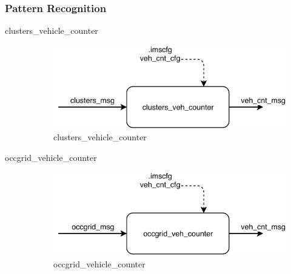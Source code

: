 \subsubsection{Pattern Recognition}
\begin{description}

\item[clusters\_vehicle\_counter] \hfill

\begin{figure}[ht!]
\centering
\includegraphics[scale=1]{fig/3/clusters_veh_counter.pdf}
\caption{clusters\_vehicle\_counter}
\label{clusters_vehicle_counter}
\end{figure}




\item[occgrid\_vehicle\_counter] \hfill

\begin{figure}[ht!]
\centering
\includegraphics[scale=1]{fig/3/occgrid_veh_counter.pdf}
\caption{occgrid\_vehicle\_counter}
\label{occgrid_vehicle_counter}
\end{figure}


\end{description}

